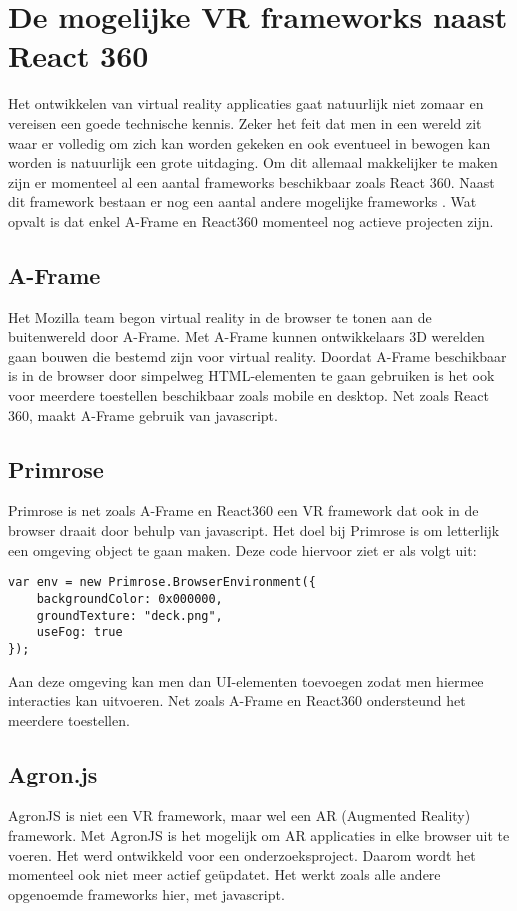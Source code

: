 \section{De mogelijke VR frameworks naast React 360}
\label{sec:frameworks-alternatieven}
Het ontwikkelen van virtual reality applicaties gaat natuurlijk niet zomaar en vereisen een goede technische kennis. Zeker het feit dat men in een wereld zit waar er volledig om zich kan worden gekeken en ook eventueel in bewogen kan worden is natuurlijk een grote uitdaging. Om dit allemaal makkelijker te maken zijn er momenteel al een aantal frameworks beschikbaar zoals React 360. Naast dit framework bestaan er nog een aantal andere mogelijke frameworks \autocite{UIUXLab2017}. Wat opvalt is dat enkel A-Frame en React360 momenteel nog actieve projecten zijn. 

\subsection{A-Frame}
\label{subsec:a-frame}
Het Mozilla team begon virtual reality in de browser te tonen aan de buitenwereld door A-Frame. Met A-Frame kunnen ontwikkelaars 3D werelden gaan bouwen die bestemd zijn voor virtual reality. Doordat A-Frame beschikbaar is in de browser door simpelweg HTML-elementen te gaan gebruiken is het ook voor meerdere toestellen beschikbaar zoals mobile en desktop. Net zoals React 360, maakt A-Frame gebruik van javascript.
 
\subsection{Primrose}
\label{subsec:primrose}
Primrose is net zoals A-Frame en React360 een VR framework dat ook in de browser draait door behulp van javascript. Het doel bij Primrose is om letterlijk een omgeving object te gaan maken. Deze code hiervoor ziet er als volgt uit:

\begin{lstlisting}[frame=single, caption=Voorbeeld van Primrose omgeving]
var env = new Primrose.BrowserEnvironment({
	backgroundColor: 0x000000,
	groundTexture: "deck.png",
	useFog: true
});
\end{lstlisting}

Aan deze omgeving kan men dan UI-elementen toevoegen zodat men hiermee interacties kan uitvoeren. Net zoals A-Frame en React360 ondersteund het meerdere toestellen.

\subsection{Agron.js}
\label{subsec:agron.js}
AgronJS is niet een VR framework, maar wel een AR (Augmented Reality) framework. Met AgronJS is het mogelijk om AR applicaties in elke browser uit te voeren. Het werd ontwikkeld voor een onderzoeksproject. Daarom wordt het momenteel ook niet meer actief geüpdatet. Het werkt zoals alle andere opgenoemde frameworks hier, met javascript.



